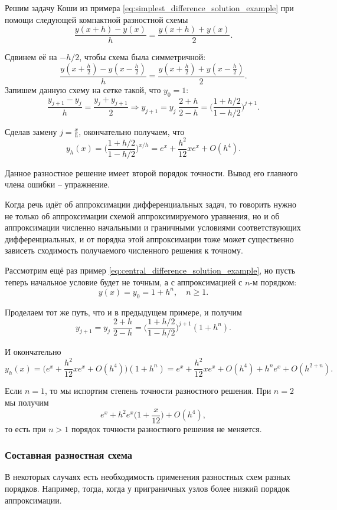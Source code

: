 \documentclass[../main.tex]{subfile}
\begin{document}
\begin{example}
\label{eq:central_difference_solution_example}
	Решим задачу Коши из примера
	\eqref{eq:simplest_difference_solution_example} при помощи следующей
	компактной разностной схемы
	\[\frac{y(x+h)-y(x)}{h}=\frac{y(x+h)+y(x)}{2}.\]

	Сдвинем её на $-h/2$, чтобы схема была симметричной:
	\[\frac{y(x+\frac{h}{2})-y(x-\frac{h}{2})}{h}=\frac{y(x+\frac{h}{2})+
	y(x-\frac{h}{2})}{2}.\]
	Запишем данную схему на сетке такой, что $y_0=1$:
	\[\frac{y_{j+1}-y_j}{h}=\frac{y_j+y_{j+1}}{2}\Rightarrow
	y_{j+1}=y_j\;\frac{2+h}{2-h}=\Big(\frac{1+h/2}{1-h/2}\Big)^{j+1}.\]

	Сделав замену $j=\frac{x}{h}$, окончательно получаем, что
	\[y_h(x)=\Big(\frac{1+h/2}{1-h/2}\Big)^{x/h}=e^x+\frac{h^2}{12}xe^x+
	O(h^4).\]

	Данное разностное решение имеет второй порядок точности. Вывод
	его главного члена ошибки -- упражнение.
\end{example}

Когда речь идёт об аппроксимации дифференциальных задач, то говорить нужно не
только об аппроксимации схемой аппроксимируемого уравнения, но и об
аппроксимации численно начальными и граничными условиями соответствующих
дифференциальных, и от порядка этой аппроксимации тоже может существенно
зависеть сходимость получаемого численного решения к точному.

\begin{example}
	Рассмотрим ещё раз пример
	\eqref{eq:central_difference_solution_example}, но пусть теперь
	начальное условие будет не точным, а с аппроксимацией с $n$-м
	порядком:
	\[y(x)=y_0=1+h^n,\quad n\ge 1.\]

	Проделаем тот же путь, что и в предыдущем примере, и получим
	\[y_{j+1}=y_j\;\frac{2+h}{2-h}=\Big(\frac{1+h/2}{1-h/2}\Big)
	^{j+1}(1+h^n).\]

	И окончательно
	\[y_h(x)=\big(e^x+\frac{h^2}{12}xe^x+O(h^4)\big)(1+h^n)=e^x+
	\frac{h^2}{12}xe^x+O(h^4)+h^ne^x+O(h^{2+n}).\]

	Если $n=1$, то мы испортим степень точности разностного решения.
	При $n=2$ мы получим
	\[e^x+h^2e^x\big(1+\frac{x}{12}\big)+O(h^4),\]
	то есть при $n>1$ порядок точности разностного решения не меняется.
\end{example}

\subsubsection{Составная разностная схема}
В некоторых случаях есть необходимость применения разностных схем разных
порядков. Например, тогда, когда у приграничных узлов более низкий порядок
аппроксимации.
\end{document}
